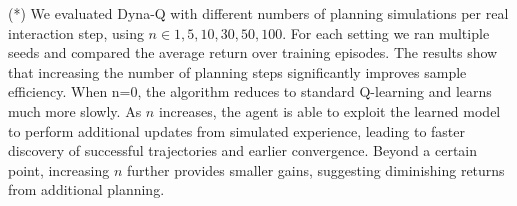 \documentclass{article}
\begin{document}
\begin{enumerate}
    (*) We evaluated Dyna-Q with different numbers of planning simulations per real interaction step, using $n\in{1,5,10,30,50,100}$. For each setting we ran multiple seeds and compared the average return over training episodes.
    The results show that increasing the number of planning steps significantly improves sample efficiency. When n=0, the algorithm reduces to standard Q-learning and learns much more slowly. As $n$ increases, the agent is able to exploit the learned model to perform additional updates from simulated experience, leading to faster discovery of successful trajectories and earlier convergence.
    Beyond a certain point, increasing $n$ further provides smaller gains, suggesting diminishing returns from additional planning.


    
\end{enumerate}
\end{document}
